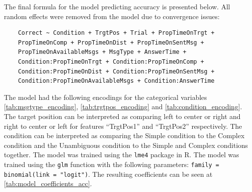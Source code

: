 The final formula for the model predicting accuracy is presented below. All random effects were removed from the model due to convergence issues:
\begin{verbatim}
    Correct ~ Condition + TrgtPos + Trial + PropTimeOnTrgt +
    PropTimeOnComp + PropTimeOnDist + PropTimeOnSentMsg + 
    PropTimeOnAvailableMsgs + MsgType + AnswerTime + 
    Condition:PropTimeOnTrgt + Condition:PropTimeOnComp +
    Condition:PropTimeOnDist + Condition:PropTimeOnSentMsg +
    Condition:PropTimeOnAvailableMsgs + Condition:AnswerTime
\end{verbatim}
The model had the following encodings for the categorical variables \autoref{tab:msgtype_encoding}, \autoref{tab:trgtpos_encoding} and \autoref{tab:condition_encoding}. The target position can be interpreted as comparing left to center or right and right to center or left for features ``TrgtPos1'' and ``TrgtPos2'' respectively. The condition can be interpreted as comparing the Simple condition to the Complex condition and the Unambiguous condition to the Simple and Complex conditions together. The model was trained using the \texttt{lme4} package in R. The model was trained using the \texttt{glm} function with the following parameters: \texttt{family = binomial(link = "logit")}. The resulting coefficients can be seen at \autoref{tab:model_coefficients_acc}. 

